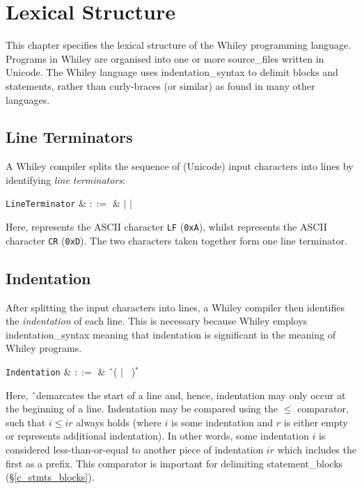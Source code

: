 \chapter{Lexical Structure}

This chapter specifies the lexical structure of the Whiley programming language.  Programs in Whiley are organised into one or more \gls{source_file}s written in Unicode.  The Whiley language uses \gls{indentation_syntax} to delimit blocks and statements, rather than curly-braces (or similar) as found in many other languages.  

\section{Line Terminators}
A Whiley compiler splits the sequence of (Unicode) input characters into lines by identifying {\em line terminators}:

\begin{syntax}
\verb+LineTerminator+ & $::=$ &  $|$  $|$ \ \\
\end{syntax}

Here,  represents the ASCII character \verb+LF+ (\verb+0xA+), whilst  represents the ASCII character \verb+CR+ (\verb+0xD+).  The two characters   taken together form one line terminator.

\section{Indentation}
After splitting the input characters into lines, a Whiley compiler then identifies the {\em indentation} of each line.  This is necessary because Whiley employs \gls{indentation_syntax} meaning that indentation is significant in the meaning of Whiley programs.  

\begin{syntax}
\verb+Indentation+ & $::=$ & \^\ \big(  $|$ \token{ }\ \big)$^*$\\
\end{syntax}

Here, \^\ demarcates the start of a line and, hence, indentation may only occur at the beginning of a line.  Indentation may be compared using the $\le$ comparator, such that $i\le ir$ always holds (where $i$ is some indentation and $r$ is either empty or represents additional indentation).  In other words, some indentation $i$ is considered less-than-or-equal to another piece of indentation $ir$ which includes the first as a prefix.  This comparator is important for delimiting \gls{statement_block}s (\S\ref{c_stmts_blocks}).

